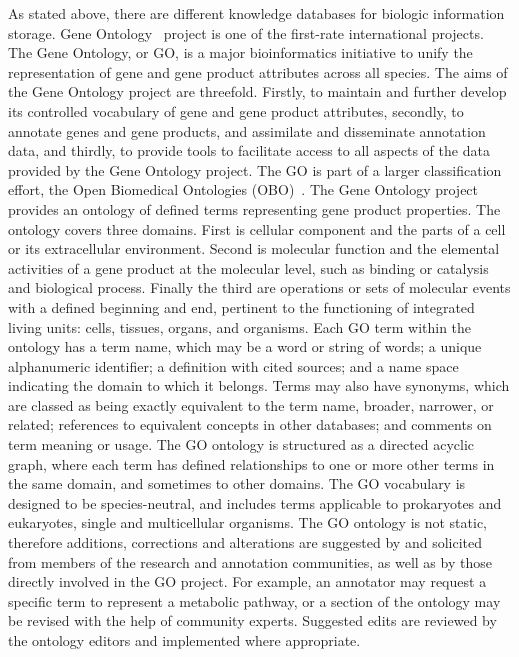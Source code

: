As stated above, there are different knowledge databases for biologic information storage.
Gene Ontology~\cite{GO_website} project is one of the first-rate international projects.
The Gene Ontology, or GO, is a major bioinformatics initiative to unify the representation of gene and gene product attributes across all species.
The aims of the Gene Ontology project are threefold. Firstly, to maintain and further develop its controlled vocabulary of gene and gene product attributes,
secondly, to annotate genes and gene products, and assimilate and disseminate annotation data,
and thirdly, to provide tools to facilitate access to all aspects of the data provided by the Gene Ontology project.
The GO is part of a larger classification effort, the Open Biomedical Ontologies (OBO)~\cite{OBO}.
The Gene Ontology project provides an ontology of defined terms representing gene product properties.
The ontology covers three domains. First is cellular component and the parts of a cell or its extracellular environment.
Second is molecular function and the elemental activities of a gene product at the molecular level, such as binding or catalysis and biological process.
Finally the third are operations or sets of molecular events with a defined beginning and end, pertinent to the functioning of integrated living units: cells, tissues, organs, and organisms. Each GO term within the ontology has a term name, which may be a word or string of words;
a unique alphanumeric identifier; a definition with cited sources; and a name space indicating the domain to which it belongs.
Terms may also have synonyms, which are classed as being exactly equivalent to the term name, broader, narrower, or related; references to equivalent concepts in other databases;
and comments on term meaning or usage. The GO ontology is structured as a directed acyclic graph, where each term has defined relationships to one or more other terms in the same domain, and sometimes to other domains. The GO vocabulary is designed to be species-neutral,
and includes terms applicable to prokaryotes and eukaryotes, single and multicellular organisms.
The GO ontology is not static, therefore additions, corrections and alterations are suggested by and solicited from members of the research and annotation communities, as well as by those directly involved in the GO project.
For example, an annotator may request a specific term to represent a metabolic pathway, or a section of the ontology may be revised with the help of community experts.
Suggested edits are reviewed by the ontology editors and implemented where appropriate.


